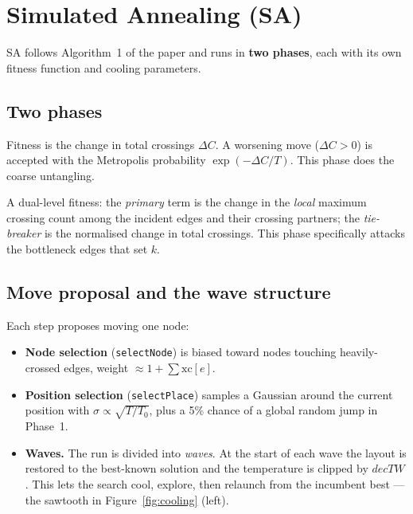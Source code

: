 \documentclass[11pt]{article}
\newcommand{\code}[1]{\colorbox{codebg}{\texttt{\small #1}}}
\begin{document}
\section{Simulated Annealing (SA)}
SA follows Algorithm~1 of the paper and runs in \textbf{two phases}, each with its own
fitness function and cooling parameters.

\subsection{Two phases}
\begin{description}[leftmargin=0em,itemsep=2pt]
  \item[\textnormal{\textbf{Phase 1 --- minimise total crossings.}}] Fitness is the
  change in total crossings $\Delta C$. A worsening move ($\Delta C>0$) is accepted with
  the Metropolis probability $\exp(-\Delta C/T)$. This phase does the coarse untangling.
  \item[\textnormal{\textbf{Phase 2 --- minimise the $k$-value.}}] A dual-level fitness:
  the \emph{primary} term is the change in the \emph{local} maximum crossing count among
  the incident edges and their crossing partners; the \emph{tie-breaker} is the
  normalised change in total crossings. This phase specifically attacks the
  bottleneck edges that set $k$.
\end{description}

\subsection{Move proposal and the wave structure}
Each step proposes moving one node:
\begin{itemize}[leftmargin=1.3em,itemsep=1pt]
  \item \textbf{Node selection} (\code{selectNode}) is biased toward nodes touching
  heavily-crossed edges, weight $\approx 1+\sum \mathrm{xc}[e]$.
  \item \textbf{Position selection} (\code{selectPlace}) samples a Gaussian around the
  current position with $\sigma \propto \sqrt{T/T_0}$, plus a 5\% chance of a global
  random jump in Phase~1.
  \item \textbf{Waves.} The run is divided into \emph{waves}. At the start of each wave
  the layout is restored to the best-known solution and the temperature is clipped by
  $decTW$. This lets the search cool, explore, then relaunch from the incumbent best ---
  the sawtooth in Figure~\ref{fig:cooling} (left).
\end{itemize}
\end{document}
